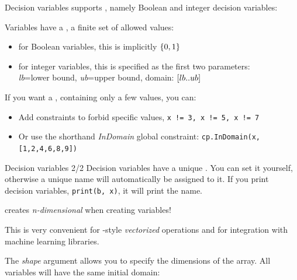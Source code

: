 \documentclass{cons-beamer}
\begin{document}
\begin{flashcardcpmpy}
\begin{frame}{Decision variables}
  \CPMpy supports , namely Boolean and integer decision variables:

  

  \vspace{1em}
  Variables have a , a finite set of allowed values:
  \begin{itemize}
    \item for {Boolean} variables, this is implicitly $\{0,1\}$
    \item for {integer} variables, this is specified as the first two parameters: \\
	    \textit{lb}=lower bound, \textit{ub}=upper bound, domain: $[lb..ub]$
  \end{itemize}

  \vspace{1em}
  If you want a , containing only a few values, you can:
  \begin{itemize}
      \item Add constraints to forbid specific values, \eg \lstinline[language=cpmpy]{x != 3, x != 5, x != 7}
      \item Or use the shorthand \textit{InDomain} global constraint: \lstinline[language=cpmpy]{cp.InDomain(x, [1,2,4,6,8,9])}
  \end{itemize}
\end{frame}

\begin{frame}{Decision variables 2/2}
  Decision variables have a unique . You can set it yourself, otherwise a unique name will automatically be assigned to it. If you print decision variables, \lstinline[language=cpmpy]{print(b, x)}, it will print the name.

  \vspace{1em}
  \CPMpy creates \emph{n-dimensional}  when creating variables!

  This is very convenient for \NumPy-style \emph{vectorized} operations and for integration with machine learning libraries.

  \vspace{1em}
  The \emph{shape} argument allows you to specify the dimensions of the array. All variables will have the same initial domain:
  
\end{frame}


\end{flashcardcpmpy}
\end{document}
